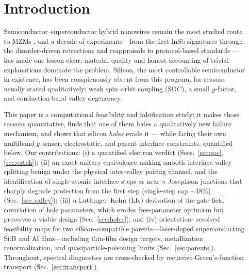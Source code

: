 \documentclass[11pt]{article}
\begin{document}
\section{Introduction}
Semiconductor--superconductor hybrid nanowires remain the most studied route to MZMs
\cite{kitaev,lutchyn2010,oreg2010}, and a decade of experiments---from the first InSb
signatures \cite{mourik} through the disorder-driven retractions and reappraisals
\cite{pan2020} to protocol-based standards \cite{aghaee}---has made one lesson clear:
material quality and honest accounting of trivial explanations dominate the problem.
Silicon, the most controllable semiconductor in existence, has been conspicuously
absent from this program, for reasons usually stated qualitatively: weak spin--orbit
coupling (SOC), a small $g$-factor, and conduction-band valley degeneracy.

This paper is a computational feasibility and falsification study: it makes
those reasons quantitative, finds that one of them hides a qualitatively new
failure mechanism, and shows that silicon \emph{holes} evade it --- while
facing their own multiband $g$-tensor, electrostatic, and parent-interface
constraints, quantified below. Our contributions: (i) a quantified electron verdict (Secs.~\ref{sec:soc},
\ref{sec:catch}); (ii) an exact unitary equivalence making smooth-interface valley
splitting benign under the physical inter-valley pairing channel, and the identification
of single-atomic interface steps as near-$\pi$ Josephson junctions that
sharply degrade protection from the first step (single-step cap $\sim$18\%) (Sec.~\ref{sec:valley}); (iii) a Luttinger--Kohn (LK)
derivation of the gate-field covariation of hole parameters, which erodes free-parameter
optimism but preserves a viable design (Sec.~\ref{sec:holes}); and (iv) orientation-
resolved feasibility maps for two silicon-compatible parents---laser-doped
superconducting Si:B \cite{bustarret,prb2010,chiodi2024,reviewSiSC} and Al
films---including thin-film design targets, metallization renormalization, and
quasiparticle-poisoning limits (Sec.~\ref{sec:parents}). Throughout, spectral
diagnostics are cross-checked by recursive-Green's-function transport
(Sec.~\ref{sec:transport}).
\end{document}
